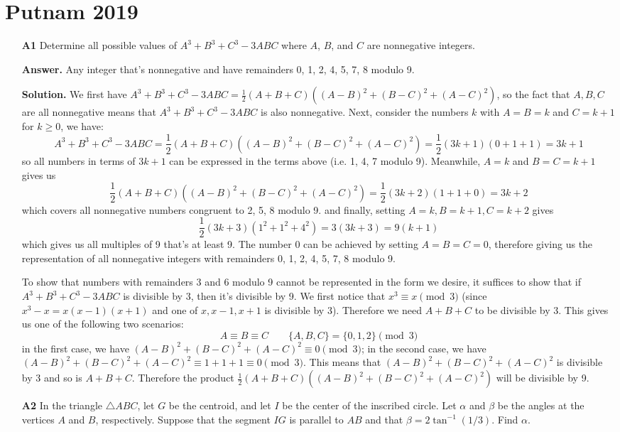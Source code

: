 \documentclass[11pt,a4paper]{article}
\newcommand{\<}{\langle}
\renewcommand{\>}{\rangle}
\begin{document}
\newcommand{\sgn}{\text{sgn}}
\setcounter{secnumdepth}{0}

\section{Putnam 2019}
\begin{enumerate}
	\item [\textbf{A1}] Determine all possible values of $A^3+B^3+C^3-3ABC$ where $A$, $B$, and $C$ are nonnegative integers.
	
	\textbf{Answer.} Any integer that's nonnegative and have remainders 0, 1, 2, 4, 5, 7, 8 modulo 9. 
	
	\textbf{Solution.} We first have $A^3+B^3+C^3-3ABC=\frac 12 (A+B+C)((A-B)^2+(B-C)^2+(A-C)^2)$, so the fact that $A, B, C$ are all nonnegative means that $A^3+B^3+C^3-3ABC$ is also nonnegative. Next, consider the numbers $k$ with $A=B=k$ and $C=k+1$ for $k\ge 0$, we have: 
	\[
	A^3+B^3+C^3-3ABC=\frac 12 (A+B+C)((A-B)^2+(B-C)^2+(A-C)^2)
	=\frac 12(3k+1)(0+1+1)=3k+1
	\]
	so all numbers in terms of $3k+1$ can be expressed in the terms above (i.e. 1, 4, 7 modulo 9). Meanwhile, $A=k$ and $B=C=k+1$ gives us 
	\[
	\frac 12 (A+B+C)((A-B)^2+(B-C)^2+(A-C)^2)
	=\frac 12 (3k+2)(1+1+0)=3k+2
	\]
	which covers all nonnegative numbers congruent to 2, 5, 8 modulo 9. 
	and finally, setting $A=k, B=k+1, C=k+2$ gives 
	\[
	\frac 12 (3k+3)(1^2+1^2+4^2)=3(3k+3)=9(k+1)
	\]
	which gives us all multiples of 9 that's at least 9. The number 0 can be achieved by setting $A=B=C=0$, therefore giving us the representation of all nonnegative integers with remainders 0, 1, 2, 4, 5, 7, 8 modulo 9. 
	
	To show that numbers with remainders 3 and 6 modulo 9 cannot be represented in the form we desire, it suffices to show that if $A^3+B^3+C^3-3ABC$ is divisible by 3, then it's divisible by 9. We first notice that $x^3\equiv x\pmod{3}$ (since $x^3-x=x(x-1)(x+1)$ and one of $x, x-1, x+1$ is divisible by 3). Therefore we need $A+B+C$ to be divisible by 3. This gives us one of the following two scenarios: 
	\[
	A\equiv B\equiv C\qquad \{A, B, C\}=\{0, 1, 2\}\pmod{3}
	\]
	in the first case, we have $(A-B)^2+(B-C)^2+(A-C)^2\equiv 0\pmod{3}$; in the second case, we have $(A-B)^2+(B-C)^2+(A-C)^2\equiv 1+1+1\equiv 0\pmod{3}$. This means that $(A-B)^2+(B-C)^2+(A-C)^2$ is divisible by 3 and so is $A+B+C$. Therefore the product $\frac 12 (A+B+C)((A-B)^2+(B-C)^2+(A-C)^2)$ will be divisible by 9. 
	
	\item [\textbf{A2}] In the triangle $\triangle ABC$, let $G$ be the centroid, and let $I$ be the center of the inscribed circle.  Let $\alpha$ and $\beta$ be the angles at the vertices $A$ and $B$, respectively.  Suppose that the segment $IG$ is parallel to $AB$ and that $\beta = 2\tan^{-1}(1/3)$.  Find $\alpha$.
	

\end{enumerate}
\end{document}
